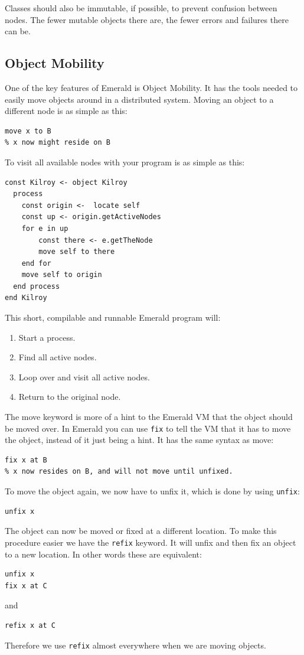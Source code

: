 Classes should also be immutable, if possible, to prevent confusion between nodes. The fewer mutable objects there are, the fewer errors and failures there can be.

\subsection{Object Mobility}
One of the key features of Emerald is Object Mobility. It has the tools needed to easily move objects around in a distributed system. Moving an object to a different node is as simple as this:
\begin{lstlisting}[language=emerald]
% x is created and resides on A
move x to B
% x now might reside on B
\end{lstlisting}
To visit all available nodes with your program is as simple as this\cite{noauthor_emerald_nodate}:
\begin{lstlisting}[language=emerald]
const Kilroy <- object Kilroy
  process
    const origin <-  locate self
    const up <- origin.getActiveNodes
    for e in up
      	const there <- e.getTheNode
      	move self to there
    end for
    move self to origin
  end process
end Kilroy
\end{lstlisting}
This short, compilable and runnable Emerald program will:
\begin{enumerate}
    \item Start a process.
    \item Find all active nodes.
    \item Loop over and visit all active nodes.
    \item Return to the original node.
\end{enumerate}


The move keyword is more of a hint to the Emerald VM that the object should be moved over. In Emerald you can use \verb|fix| to tell the VM that it has to move the object, instead of it just being a hint. It has the same syntax as move:
\begin{lstlisting}[language=emerald]
% x is created and resides on A
fix x at B
% x now resides on B, and will not move until unfixed.
\end{lstlisting}
To move the object again, we now have to unfix it, which is done by using \verb|unfix|:
\begin{lstlisting}[language=emerald]
unfix x
\end{lstlisting}
The object can now be moved or fixed at a different location. To make this procedure easier we have the \verb|refix| keyword. It will unfix and then fix an object to a new location. In other words these are equivalent:
\begin{lstlisting}[language=emerald]
unfix x
fix x at C
\end{lstlisting}
and
\begin{lstlisting}[language=emerald]
refix x at C
\end{lstlisting}
Therefore we use \verb|refix| almost everywhere when we are moving objects. 



